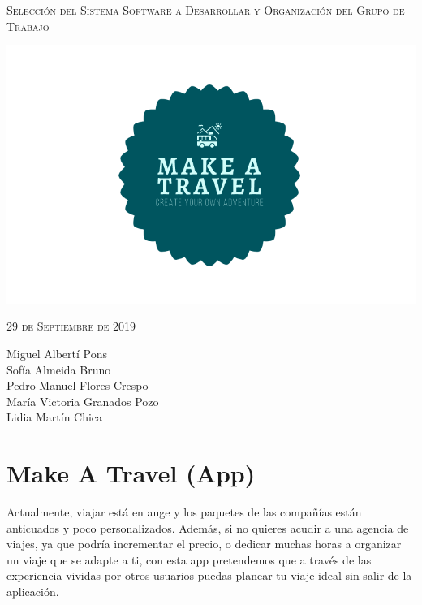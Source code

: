 \documentclass[11pt]{article}
\begin{document}
\begin{titlepage}
\centering
\vspace{4.5cm}
{\scshape\LARGE Selección del Sistema Software a Desarrollar y Organización del Grupo de Trabajo \par}
\vspace{1.5cm}

\includegraphics[width=16cm] {Logo}

\vspace{3cm}
{\scshape\large 29 de Septiembre de 2019\par}
\vspace{1cm}

{Miguel Albertí Pons\\
Sofía Almeida Bruno\\
Pedro Manuel Flores Crespo\\
María Victoria Granados Pozo\\
Lidia Martín Chica
\par}

\end{titlepage}





\newpage
\section {Make A Travel (App)}
Actualmente, viajar está en auge y los paquetes de las compañías están anticuados y poco personalizados. Además, si no quieres acudir a una agencia de viajes, ya que podría incrementar el precio, o dedicar muchas horas a organizar un viaje que se adapte a ti, con esta app pretendemos que a través de las experiencia vividas por otros usuarios puedas planear tu viaje ideal sin salir de la aplicación.
\end{document}
